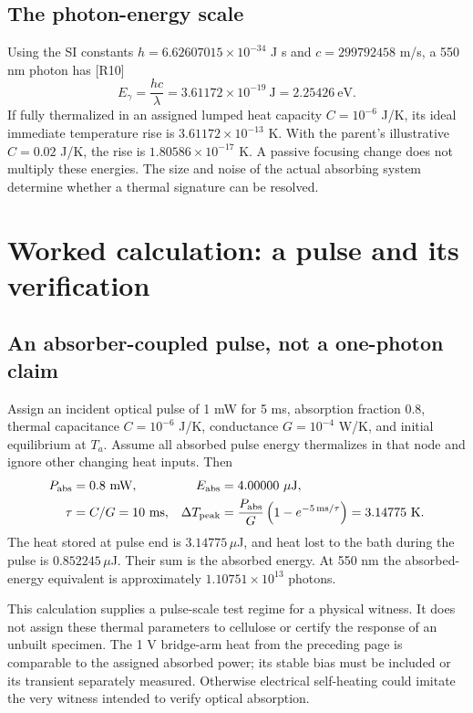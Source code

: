 \documentclass[10pt,a4paper]{article}
\numberwithin{equation}{section}
\newcommand{\newpart}{\clearpage}
\begin{document}
\subsection*{The photon-energy scale}
Using the SI constants $h=6.62607015\times10^{-34}$ J s and $c=299792458$ m/s, a 550 nm photon has [R10]
\begin{equation}
E_\gamma=\frac{hc}{\lambda}=3.61172\times10^{-19}\ \mathrm J
=2.25426\ \mathrm{eV}.
\end{equation}
If fully thermalized in an assigned lumped heat capacity $C=10^{-6}$ J/K, its ideal immediate temperature rise is $3.61172\times10^{-13}$ K. With the parent's illustrative $C=0.02$ J/K, the rise is $1.80586\times10^{-17}$ K. A passive focusing change does not multiply these energies. The size and noise of the actual absorbing system determine whether a thermal signature can be resolved.

\newpart
\section{Worked calculation: a pulse and its verification}
\label{sec:numbers2}

\subsection*{An absorber-coupled pulse, not a one-photon claim}
Assign an incident optical pulse of 1 mW for 5 ms, absorption fraction 0.8, thermal capacitance $C=10^{-6}$ J/K, conductance $G=10^{-4}$ W/K, and initial equilibrium at $T_a$. Assume all absorbed pulse energy thermalizes in that node and ignore other changing heat inputs. Then
\begin{align}
P_{\rm abs}&=0.8\ \mathrm{mW},& E_{\rm abs}&=4.00000\ \mu\mathrm J,\\
\tau&=C/G=10\ \mathrm{ms},&
\Delta T_{\rm peak}&=\frac{P_{\rm abs}}G\left(1-e^{-5\,\mathrm{ms}/\tau}\right)
=3.14775\ \mathrm K.
\end{align}
The heat stored at pulse end is $3.14775\,\mu$J, and heat lost to the bath during the pulse is $0.852245\,\mu$J. Their sum is the absorbed energy. At 550 nm the absorbed-energy equivalent is approximately $1.10751\times10^{13}$ photons.

This calculation supplies a pulse-scale test regime for a physical witness. It does not assign these thermal parameters to cellulose or certify the response of an unbuilt specimen. The 1 V bridge-arm heat from the preceding page is comparable to the assigned absorbed power; its stable bias must be included or its transient separately measured. Otherwise electrical self-heating could imitate the very witness intended to verify optical absorption.
\end{document}
